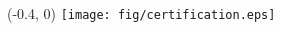 \documentclass[a4paper, 12pt]{book}
\begin{document}
\maketitle


\frontmatter

\hspace*{-6cm}
\begin{textblock}{16}(-0.4, 0)
	\texttt{[image: fig/certification.eps]}
\end{textblock}
\newpage

\begin{CJK}{UTF8}{nkai}
\CJKhorz

\onehalfspacing
%


\tableofcontents
\end{CJK}
\listoffigures
\listoftables

\mainmatter

\renewcommand{\arraystretch}{2.0}
\doublespacing









\backmatter





\appendix
%
\end{document}
